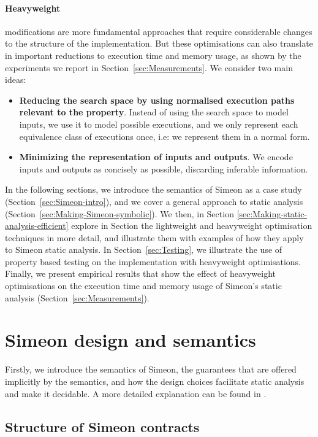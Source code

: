 \documentclass[english,runningheads]{llncs}
\begin{document}
\paragraph*{Heavyweight}

modifications are more fundamental approaches that require considerable
changes to the structure of the implementation. But these optimisations can also
translate in important reductions to execution time and memory usage, as
shown by the experiments we report in Section~\ref{sec:Measurements}.
We consider two main ideas:
\begin{itemize}
\item \textbf{Reducing the search space by using normalised execution paths relevant
to the property}. Instead of using the search space to model inputs, we
use it to model possible executions, and we only
represent each equivalence class of executions once, i.e:
we represent them in a normal form.
\item \textbf{Minimizing the representation of inputs and outputs}. We encode inputs
and outputs as concisely as possible, discarding inferable information.
\end{itemize}
In the following sections, we introduce the semantics of Simeon as
a case study (Section~\ref{sec:Simeon-intro}), and we cover a
general approach to static analysis (Section~\ref{sec:Making-Simeon-symbolic}).
We then, in Section \ref{sec:Making-static-analysis-efficient} explore in Section the lightweight and heavyweight 
optimisation techniques in more detail, and illustrate them with
examples of how they apply to Simeon static analysis. In Section~\ref{sec:Testing},
we illustrate the use of property based testing on the implementation with
heavyweight optimisations. Finally, we present empirical results that
show the effect of heavyweight optimisations on the execution time
and memory usage of Simeon's static analysis (Section~\ref{sec:Measurements}).

\section{Simeon design and semantics\label{sec:Simeon-intro} }

Firstly, we introduce the semantics of Simeon, the guarantees
that are offered implicitly by the semantics, and how the design choices
facilitate static analysis and make it decidable. A more detailed
explanation can be found in \cite{simeon2020}.

\subsection{Structure of Simeon contracts\label{subsec:Structure-of-Simeon} }
\end{document}
